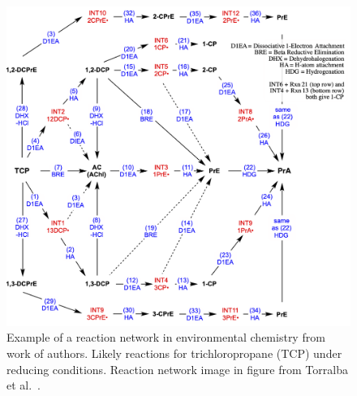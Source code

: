 \documentclass[runningheads,a4paper]{llncs}
\begin{document}
\begin{figure}[!h]
   \centering
   \includegraphics[width=1.0\textwidth]{images/tcp-sanchez.png}
   \caption{Example of a reaction network in environmental chemistry from work of authors.  Likely reactions for trichloropropane (TCP) under reducing conditions. Reaction network image in figure from Torralba et al.~\cite{torralba2020reduction}.}
   \label{fig.intro.rxnnetwork}
\end{figure}
\end{document}
